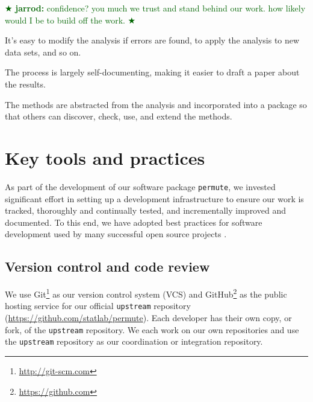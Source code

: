 \documentclass[]{article}
\newcommand{\jarrod}[1] { \textcolor{darkgreen} {
\ensuremath{\bigstar} {\bf jarrod:}  {#1}
\ensuremath{\bigstar} } }
\begin{document}

\jarrod{confidence?  you much we trust and stand behind our work.
how likely would I be to build off the work.}

It's easy to modify the analysis if errors are found, to apply the
analysis to new data sets, and so on.

The process is largely self-documenting, making it easier to draft a
paper about the results.

The methods are abstracted from the analysis and incorporated into a
package so that others can discover, check, use, and extend the
methods.

\section{Key tools and practices}\label{key-tools}


As part of the development of our software package \texttt{permute}, we
invested significant effort in setting up a development infrastructure to
ensure our work is tracked, thoroughly and continually tested, and
incrementally improved and documented.
To this end, we have adopted best practices for software development used by
many successful open source projects \cite{millman2014developing}.

\subsection{\label{sec:vc}Version control and code review}

We use Git\footnote{\url{http://git-scm.com}} as our version control system
(VCS) and GitHub\footnote{\url{https://github.com}} as the public hosting
service for our official \texttt{upstream} repository
(\url{https://github.com/statlab/permute}).
Each developer has their own copy, or fork, of the \texttt{upstream}
repository.
We each work on our own repositories and use the \texttt{upstream} repository
as our coordination or integration repository.
\end{document}
